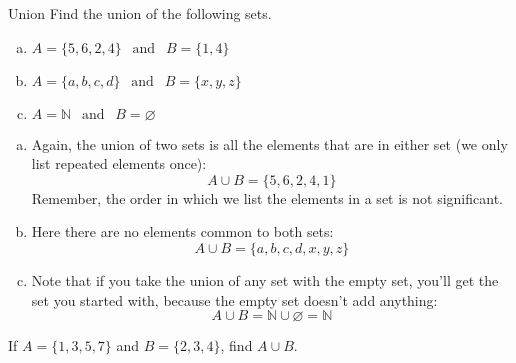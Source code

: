 \begin{example}{Union}
Find the union of the following sets.
\begin{enumerate}[(a)]
\item $A = \{5,6,2,4\} \ \ \textrm{ and } \ \ B = \{1,4\}$
\item $A = \{a,b,c,d\} \ \ \textrm{ and } \ \ B = \{x,y,z\}$
\item $A = \mathbb{N} \ \ \textrm{ and } \ \ B = \varnothing$
\end{enumerate}

\sol
\begin{enumerate}[(a)]
\item Again, the union of two sets is all the elements that are in either set (we only list repeated elements once):
\[\boxed{A \cup B = \{5,6,2,4,1\}}\]  Remember, the order in which we list the elements in a set is not significant.

\item Here there are no elements common to both sets:
\[\boxed{A \cup B = \{a, b, c, d, x, y, z\}}\]

\item Note that if you take the union of any set with the empty set, you'll get the set you started with, because the empty set doesn't add anything:
\[\boxed{A \cup B = \mathbb{N} \cup \varnothing = \mathbb{N}}\]
\end{enumerate}
\end{example}

\begin{try}
If $A=\{1,3,5,7\}$ and $B=\{2,3,4\}$, find $A \cup B$.
\end{try}
\vfill
\pagebreak

